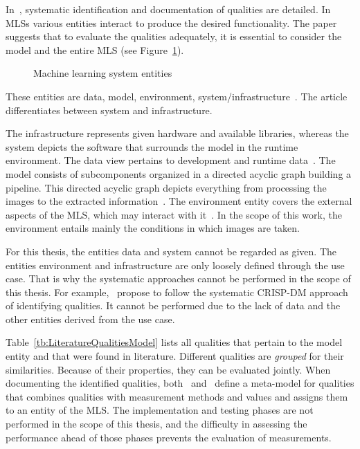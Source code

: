 In~\cite{nakamichi_requirements-driven_2020,siebert_construction_2021}, systematic
identification and documentation of qualities are detailed.
In \acp{MLS} various entities interact to produce the desired functionality.
The paper~\cite{nakamichi_requirements-driven_2020} suggests that to evaluate
the qualities adequately, it is essential to consider the model and the entire \ac{MLS}
(see Figure~\ref{fig:MLS}).
\begin{figure}[ht]
    \centering
    
    \caption[Machine learning system entities]{%
        Machine learning system entities~\citep{nakamichi_requirements-driven_2020}\label{fig:MLS}
    }
\end{figure}
These entities are data, model, environment,
system/infrastructure~\citep{nakamichi_requirements-driven_2020, siebert_construction_2021}.
The article~\cite{siebert_construction_2021} differentiates between system and infrastructure.

The infrastructure represents given hardware and available libraries, whereas the system depicts
the software that surrounds the model in the runtime environment.
The data view pertains to development and runtime data~\citep{siebert_construction_2021}.
The model consists of subcomponents organized in a directed acyclic graph building a
pipeline.
This directed acyclic graph depicts everything from processing the images to the extracted
information~\citep{siebert_construction_2021}.
The environment entity covers the external aspects of the \ac{MLS}, which may interact with
it~\citep{siebert_construction_2021}.
In the scope of this work, the environment entails mainly the conditions in which images are taken.

For this thesis, the entities data and system cannot be regarded as given.
The entities environment and infrastructure are only loosely defined through the use case.
That is why the systematic approaches cannot be performed in the scope of this thesis.
For example,~\cite{siebert_construction_2021} propose to follow the systematic CRISP-DM approach of
identifying qualities.
It cannot be performed due to the lack of data and the other entities derived from the use case.

Table~\ref{tb:LiteratureQualitiesModel} lists all qualities that pertain to the model entity
and that were found in literature.
Different qualities are \textit{grouped} for their similarities.
Because of their properties, they can be evaluated jointly.
When documenting the identified qualities,
both~\cite{nakamichi_requirements-driven_2020} and~\cite{siebert_construction_2021} define a
meta-model for qualities that combines qualities with
measurement methods and values and assigns them to an entity of the \ac{MLS}.
The implementation and testing phases are not performed in the scope of this thesis, and the
difficulty in assessing the performance ahead of those phases prevents the evaluation
of measurements.

